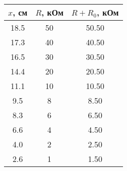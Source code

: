 \begin{tabular}{ccc}
\toprule
$x$, см & $R$, кОм &  $R+R_0$, кОм\\
\midrule
18.5 & 50 & 50.50 \\
17.3 & 40 & 40.50 \\
16.5 & 30 & 30.50 \\
14.4 & 20 & 20.50 \\
11.1 & 10 & 10.50 \\
9.5  & 8  & 8.50  \\
8.3  & 6  & 6.50  \\
6.6  & 4  & 4.50  \\
4.0  & 2  & 2.50  \\
2.6  & 1  & 1.50  \\
\bottomrule
\end{tabular}